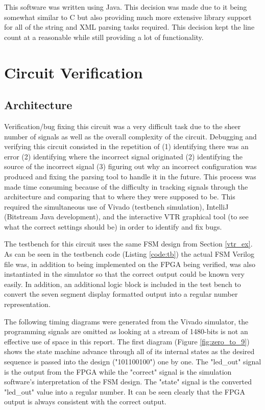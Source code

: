 \documentclass[12pt]{article}
\begin{document}
This software was written using Java. This decision was made due to it being somewhat
similar to C but also providing much more extensive library support for all of the
string and XML parsing tasks required. This decision kept the line count at a reasonable
while still providing a lot of functionality. 

\newpage
\section{Circuit Verification}

\subsection{Architecture}

Verification/bug fixing this circuit was a very difficult task due to the sheer number of signals
as well as the overall complexity of the circuit. Debugging and verifying this circuit
consisted in the repetition of (1) identifying there was an error (2) identifying where
the incorrect signal originated (2) identifying the source of the incorrect signal
(3) figuring out why an incorrect configuration was produced and fixing the parsing
tool to handle it in the future. This process was made time consuming because of
the difficulty in tracking signals through the architecture and comparing that to where
they were supposed to be. This required the simultaneous use of Vivado (testbench simulation),
IntelliJ (Bitstream Java development), and the interactive VTR graphical tool (to see what
the correct settings should be) in order to identify and fix bugs.

The testbench for this circuit uses the same FSM design from Section \ref{vtr_ex}.
As can be seen in the testbench code (Listing \ref{code:tb}) the actual FSM Verilog
file was, in addition to being implemented on the FPGA being verified, was also
instantiated in the simulator so that the correct output could be known very easily. In addition,
an additional logic block is included in the test bench to convert the seven segment
display formatted output into a regular number representation.

The following timing diagrams were generated from the Vivado simulator, the programming
signals are omitted as looking at a stream of 1480-bits is not an effective use of space
in this report. The first
diagram (Figure \ref{fig:zero_to_9}) shows the state machine advance through all of
its internal states as the desired sequence is passed into the design ("101100100")
one by one. The "led\_out" signal is the output from the FPGA while the "correct" signal
is the simulation software's interpretation of the FSM design. The "state" signal is
the converted "led\_out" value into a regular number. It can be seen clearly that
the FPGA output is always consistent with the correct output.
\end{document}

